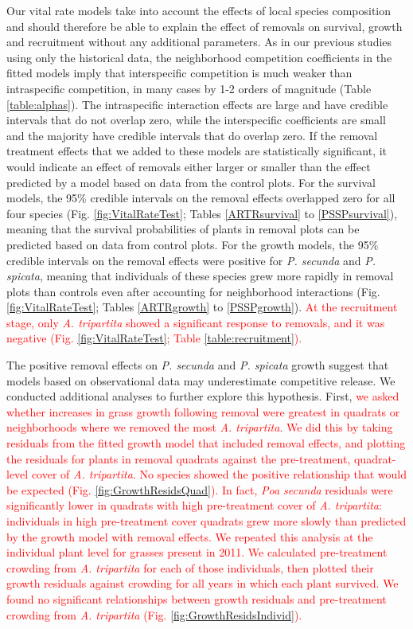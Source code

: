 \documentclass[11pt]{article}
\newcommand{\new}{\textcolor{red}}
\begin{document}
\begin{doublespacing}
Our vital rate models take into account the effects of local species composition and should therefore be able 
to explain the effect of removals on survival, growth and recruitment without any additional parameters. 
As in our previous studies using only the historical data, the neighborhood competition coefficients in the 
fitted models imply that interspecific competition is much weaker than intraspecific competition, in many
cases by 1-2 orders of magnitude (Table \ref{table:alphas}). The intraspecific interaction effects are large and have credible intervals that 
do not overlap zero, while the interspecific coefficients are small and the majority have credible intervals that do overlap zero.
If the removal treatment effects that we added to these models are statistically significant, it would indicate an effect of 
removals either larger or smaller than the effect predicted by a model based on data from the control plots. 
For the survival models, the 95\% credible intervals on the removal effects overlapped zero for all four species (Fig. \ref{fig:VitalRateTest}; 
Tables \ref{ARTRsurvival} to \ref{PSSPsurvival}), meaning that the survival probabilities of plants in removal plots can be predicted based on data 
from control plots. For the growth models, the 95\% credible intervals on the removal effects were positive for \textit{P. secunda}  and \textit{P. spicata},
 meaning that individuals of these species grew more rapidly in removal plots than controls even after accounting for neighborhood interactions 
 (Fig. \ref{fig:VitalRateTest}; Tables \ref{ARTRgrowth} to \ref{PSSPgrowth}). \new{ At the recruitment stage, only \textit{A. tripartita} showed a significant response to removals, and it was negative (Fig. \ref{fig:VitalRateTest}; Table \ref{table:recruitment}).}

The positive removal effects on \textit{P. secunda}  and \textit{P. spicata} growth suggest that models based on observational data may underestimate competitive release. We conducted additional analyses to further explore this hypothesis.
First, \new{we asked whether increases in grass growth following removal were greatest in quadrats or neighborhoods where we removed the most \textit{A. tripartita}. We did this by taking residuals from the fitted growth model that included removal effects, and plotting the residuals for plants in removal quadrats against the pre-treatment, quadrat-level cover of \textit{A. tripartita}. No species showed the positive relationship that would be expected (Fig. \ref{fig:GrowthResidsQuad}).
In fact, \textit{Poa secunda} residuals were significantly lower in quadrats with high pre-treatment cover of \textit{A. tripartita}: individuals in high pre-treatment cover quadrats grew more slowly than predicted by the growth model with removal effects. We repeated this analysis at the individual plant level for grasses present in 2011. We calculated pre-treatment crowding from \textit{A. tripartita} for each of those individuals, then plotted their growth residuals against crowding for all years in which each plant survived. We found no significant relationships between growth residuals and pre-treatment crowding from \textit{A. tripartita} (Fig. \ref{fig:GrowthResidsIndivid}). }


\end{doublespacing}
\end{document}
